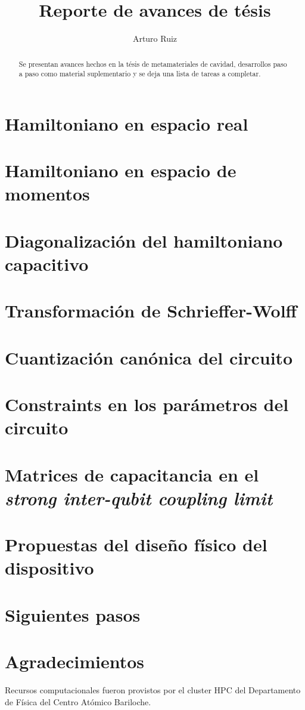 \documentclass[reprint, superscriptaddress, amsmath, amssymb, aps, prb, floatfix]{revtex4-2}
\begin{document}
\title{Reporte de avances de tésis}
\author{Arturo Ruiz}

\begin{abstract}
    Se presentan avances hechos en la tésis de metamateriales de cavidad, desarrollos paso a paso como material suplementario y se deja una lista de tareas a completar.
\end{abstract}
\maketitle
\section{Hamiltoniano en espacio real}

\section{Hamiltoniano en espacio de momentos}

\section{Diagonalización del hamiltoniano capacitivo}

\section{Transformación de Schrieffer-Wolff}

\section{Cuantización canónica del circuito}

\section{Constraints en los parámetros del circuito}

\section{Matrices de capacitancia en el \textit{strong inter-qubit coupling limit}}

\section{Propuestas del diseño físico del dispositivo}

\section{Siguientes pasos}

\section*{Agradecimientos}
Recursos computacionales fueron provistos por el cluster HPC del Departamento de Física del Centro Atómico Bariloche.
\appendix

\end{document}
